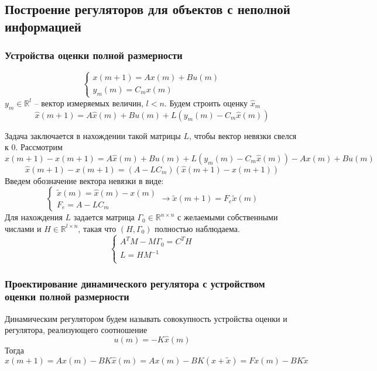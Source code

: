 \documentclass[a4paper, 14pt]{extarticle}
\theoremstyle{definition}
\theoremstyle{plain}
\theoremstyle{remark}
\begin{document}
\subsection{Построение регуляторов для объектов с неполной информацией}
\subsubsection{Устройства оценки полной размерности}
\[
\begin{cases}
	x(m+1) = A x(m) + B u(m) \\
	y_m(m) = C_m x(m)
\end{cases}
\]
\(y_m \in \mathds{R}^l\) -- вектор измеряемых величин, \(l < n\). 
Будем строить оценку \(\hat x_m\)
\[\hat x(m+1) = A \hat x(m) + B u(m) + L(y_m(m) - C_m \hat x(m))\]

Задача заключается в нахождении такой матрицы \(L\), чтобы вектор невязки свелся к 0. Рассмотрим
\[\hat x(m+1) - x(m+1) = A \hat x(m) + B u(m) + L(y_m(m) - C_m \hat x(m)) - A x(m) + B u(m)\]
\[\hat x(m+1) - x(m+1) = (A - LC_m)(\hat x(m+1) - x(m+1))\]
Введем обозначение вектора невязки в виде:
\[
\begin{cases}
	\tilde x(m) = \hat x(m) - x(m) \\
	F_e = A - LC_m
\end{cases} \rightarrow
	\tilde x(m+1) = F_e  \tilde x(m)
\]
Для нахождения \(L\) задается матрица \(\Gamma_0 \in \mathds{R}^{n \times n}\) с желаемыми собственными числами и  \(H \in \mathds{R}^{l \times n}\), такая что \((H, \Gamma_0)\) полностью наблюдаема.
\[
	\begin{cases}
		A^T M - M \Gamma_0 = C^T H \\
		L = H M^{-1} \\
	\end{cases}
\]

\subsubsection{Проектирование динамического регулятора с устройством оценки полной размерности}

Динамическим регулятором будем называть совокупность устройства оценки и регулятора, реализующего соотношение
\[u(m) = -K \hat x(m)\]
Тогда
\[
	x(m+1) = A x(m) - B K \hat x(m) = A x(m) - BK (x + \tilde x) = Fx(m) - BK \tilde x
\]
\end{document}
